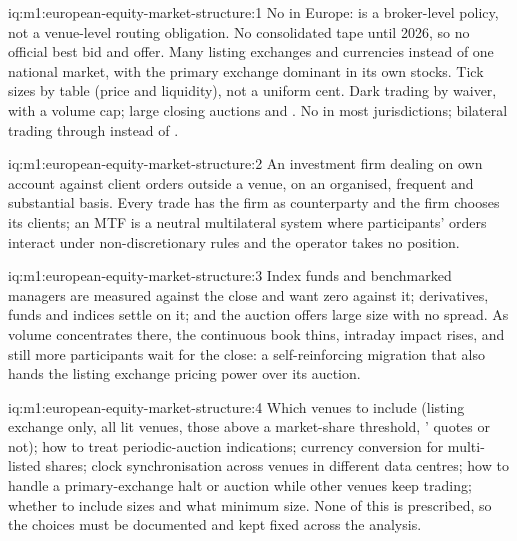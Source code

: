 \begin{solution}{iq:m1:european-equity-market-structure:1}
No  in Europe:  is a broker-level policy,
not a venue-level routing obligation. No consolidated tape until 2026, so no
official best bid and offer. Many listing exchanges and currencies instead of
one national market, with the primary exchange dominant in its own stocks.
Tick sizes by table (price and liquidity), not a uniform cent. Dark trading
by waiver, with a volume cap; large closing auctions and .
No  in most jurisdictions; bilateral trading through
 instead of .
\end{solution}

\begin{solution}{iq:m1:european-equity-market-structure:2}
An investment firm dealing on own account against client orders outside a
venue, on an organised, frequent and substantial basis. Every trade has the
firm as counterparty and the firm chooses its clients; an MTF is a neutral
multilateral system where participants' orders interact under
non-discretionary rules and the operator takes no position.
\end{solution}

\begin{solution}{iq:m1:european-equity-market-structure:3}
Index funds and benchmarked managers are measured against the close and want
zero  against it; derivatives, funds and indices settle on it;
and the auction offers large size with no spread. As volume concentrates
there, the continuous book thins, intraday impact rises, and still more
participants wait for the close: a self-reinforcing migration that also
hands the listing exchange pricing power over its auction.
\end{solution}

\begin{solution}{iq:m1:european-equity-market-structure:4}
Which venues to include (listing exchange only, all lit venues, those above a
market-share threshold, ' quotes or not); how to
treat periodic-auction indications; currency conversion for multi-listed
shares; clock synchronisation across venues in different data centres; how to
handle a primary-exchange halt or auction while other venues keep trading;
whether to include sizes and what minimum size. None of this is prescribed,
so the choices must be documented and kept fixed across the analysis.
\end{solution}

